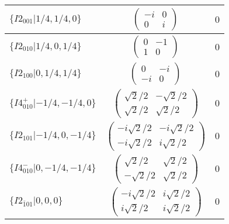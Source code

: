 \documentclass[3p,preprint]{elsarticle}
\begin{document}
\begin{table}[H]
\begin{tabular}{|l|c||c|}
		$\{I2_{001}|1/4,1/4,0\}$ &		$\left(\begin{array}{cc} -i&0 \\ 0&i \end{array}\right)$	&$0$ \\ \hline
		$\{I2_{010}|1/4,0,1/4\}$ &		$\left(\begin{array}{cc} 0&-1 \\ 1&0 \end{array}\right)$	&$0$ \\ \hline
		$\{I2_{100}|0,1/4,1/4\}$ &		$\left(\begin{array}{cc} 0&-i \\ -i&0 \end{array}\right)$	&$0$ \\ \hline
		$\{I4^{+}_{010}|-1/4,-1/4,0\}$ &		$\left(\begin{array}{cc} \sqrt{2}/2&-\sqrt{2}/2 \\ \sqrt{2}/2&\sqrt{2}/2 \end{array}\right)$	&$0$ \\ \hline
		$\{I2_{101}|-1/4,0,-1/4\}$ &		$\left(\begin{array}{cc} -i\sqrt{2}/2&-i\sqrt{2}/2 \\ -i\sqrt{2}/2&i\sqrt{2}/2 \end{array}\right)$	&$0$ \\ \hline
		$\{I4^{-}_{010}|0,-1/4,-1/4\}$ &		$\left(\begin{array}{cc} \sqrt{2}/2&\sqrt{2}/2 \\ -\sqrt{2}/2&\sqrt{2}/2 \end{array}\right)$	&$0$ \\ \hline
		$\{I2_{\bar{1}01}|0,0,0\}$ &		$\left(\begin{array}{cc} -i\sqrt{2}/2&i\sqrt{2}/2 \\ i\sqrt{2}/2&i\sqrt{2}/2 \end{array}\right)$	&$0$ \\ \hline
	\end{tabular}
\end{table}
\end{document}
